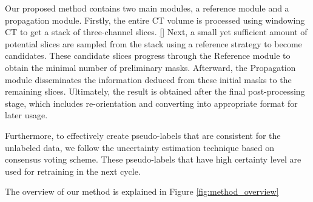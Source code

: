 Our proposed method contains two main modules, a reference module and a propagation module.
Firstly, the entire CT volume is processed using windowing CT to get a stack of three-channel slices. \ref{}
Next, a small yet sufficient amount of potential slices are sampled from the stack using a reference strategy to become candidates. These candidate slices progress through the Reference module to obtain the minimal number of preliminary masks.
Afterward, the Propagation module disseminates the information deduced from these initial masks to the remaining slices.
Ultimately, the result is obtained after the final post-processing stage, which includes re-orientation and converting into appropriate format for later usage.

Furthermore, to effectively create pseudo-labels that are consistent for the unlabeled data, we follow the uncertainty estimation technique based on consensus voting scheme. These pseudo-labels that have high certainty level are used for retraining in the next cycle.

The overview of our method is explained in Figure \ref{fig:method_overview}